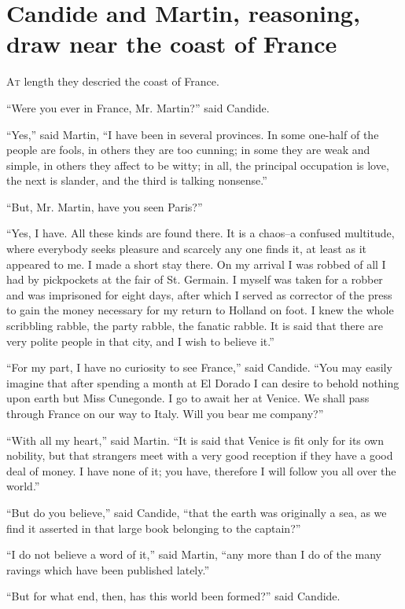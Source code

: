 \chapter{Candide and Martin, reasoning,  draw near the coast of France}
\lettrine[lraise=0.1,nindent=0em,slope=-.5em]{A}{t} length they descried the coast of France.

``Were you ever in France, Mr. Martin?'' said Candide.

``Yes,'' said Martin, ``I have been in several provinces. In some one-half of the people are fools, in others they are too cunning; in some they are weak and simple, in others they affect to be witty; in all, the principal occupation is love, the next is slander, and the third is talking nonsense.''

``But, Mr. Martin, have you seen Paris?''

``Yes, I have. All these kinds are found there. It is a chaos--a confused multitude, where everybody seeks pleasure and scarcely any one finds it, at least as it appeared to me. I made a short stay there. On my arrival I was robbed of all I had by pickpockets at the fair of St. Germain. I myself was taken for a robber and was imprisoned for eight days, after which I served as corrector of the press to gain the money necessary for my return to Holland on foot. I knew the whole scribbling rabble, the party rabble, the fanatic rabble. It is said that there are very polite people in that city, and I wish to believe it.''

``For my part, I have no curiosity to see France,'' said Candide. ``You may easily imagine that after spending a month at El Dorado I can desire to behold nothing upon earth but Miss Cunegonde. I go to await her at Venice. We shall pass through France on our way to Italy. Will you bear me company?''

``With all my heart,'' said Martin. ``It is said that Venice is fit only for its own nobility, but that strangers meet with a very good reception if they have a good deal of money. I have none of it; you have, therefore I will follow you all over the world.''

``But do you believe,'' said Candide, ``that the earth was originally a sea, as we find it asserted in that large book belonging to the captain?''

``I do not believe a word of it,'' said Martin, ``any more than I do of the many ravings which have been published lately.''

``But for what end, then, has this world been formed?'' said Candide.

